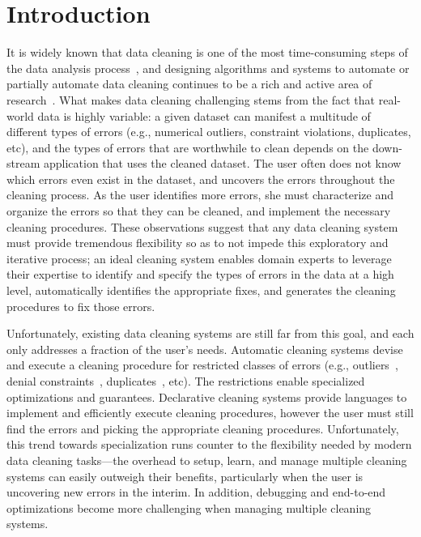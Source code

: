 % 

\section{Introduction}\label{intro}\sloppy
It is widely known that data cleaning is one of the most time-consuming steps of the data analysis process~\cite{nytimes}, and
designing algorithms and systems to automate or partially automate data cleaning continues to be a rich and active area of research~\cite{DBLP:conf/sigmod/ChuIKW16}.
What makes data cleaning challenging stems from the fact that real-world data is highly variable: a given dataset can manifest a multitude of different types of errors (e.g., numerical outliers, constraint violations, duplicates, etc), and the types of errors that are worthwhile to clean depends on the down-stream application that uses the cleaned dataset.  The user often does not know which errors even exist in the dataset, and uncovers the errors throughout the cleaning process.
As the user identifies more errors, she must characterize and organize the errors so that they can be cleaned, and implement the necessary cleaning procedures.
These observations suggest that any data cleaning system must provide tremendous flexibility so as to not impede this exploratory and iterative process; an ideal cleaning system enables domain experts to leverage their expertise to identify and specify the types of errors in the data at a high level, automatically identifies the appropriate fixes, and generates the cleaning procedures to fix those errors.  

Unfortunately, existing data cleaning systems are still far from this goal, and each only addresses a fraction of the user's needs.
Automatic cleaning systems devise and execute a cleaning procedure for restricted classes of errors (e.g., outliers~\cite{}, denial constraints~\cite{}, duplicates~\cite{}, etc).  The restrictions enable specialized optimizations and guarantees.  
Declarative cleaning systems provide languages to implement and efficiently execute cleaning procedures, however the user must still find the errors and picking the appropriate cleaning procedures.
Unfortunately, this trend towards specialization runs counter to the flexibility needed by modern data cleaning tasks---the overhead to setup, learn, and manage multiple  cleaning systems can easily outweigh their benefits, particularly when the user is uncovering new errors in the interim.    In addition, debugging and end-to-end optimizations become more challenging when managing multiple cleaning systems.


